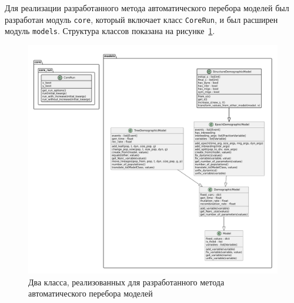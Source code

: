 Для реализации разработанного метода автоматического перебора моделей был разработан модуль \texttt{core}, который включает класс \texttt{CoreRun}, и был расширен модуль \texttt{models}.
Структура классов показана на рисунке~\ref{fig:part4:auto_method_impl}.

\begin{figure}[ht]
    \centering
    \includegraphics[width=0.97\linewidth]{images/part4/auto_model_implementation.pdf}
    \caption{Два класса, реализованных для разработанного метода автоматического перебора моделей}
    \label{fig:part4:auto_method_impl}
\end{figure}

